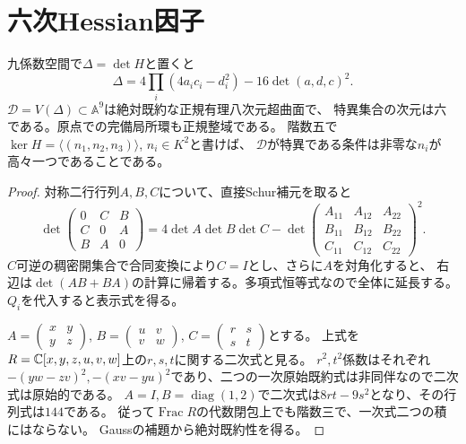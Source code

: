\section{六次Hessian因子}
\begin{theorem}\label{mh:delta}
九係数空間で$\Delta=\det H$と置くと
\[
 \Delta=4\prod_i(4a_ic_i-d_i^2)-16\det(a,d,c)^2.
\]
$\mathcal D=V(\Delta)\subset\mathbb A^9$は絶対既約な正規有理八次元超曲面で、
特異集合の次元は六である。原点での完備局所環も正規整域である。
階数五で$\ker H=\langle(n_1,n_2,n_3)\rangle$, $n_i\in K^2$と書けば、
$\mathcal D$が特異である条件は非零な$n_i$が高々一つであることである。
\end{theorem}
\begin{proof}
対称二行行列$A,B,C$について、直接Schur補元を取ると
\[
 \det\begin{pmatrix}0&C&B\\C&0&A\\B&A&0\end{pmatrix}
 =4\det A\det B\det C-
 \det\begin{pmatrix}A_{11}&A_{12}&A_{22}\\B_{11}&B_{12}&B_{22}\\C_{11}&C_{12}&C_{22}\end{pmatrix}^{\!2}.
\]
$C$可逆の稠密開集合で合同変換により$C=I$とし、さらに$A$を対角化すると、
右辺は$\det(AB+BA)$の計算に帰着する。多項式恒等式なので全体に延長する。
$Q_i$を代入すると表示式を得る。

$A=\left(\begin{smallmatrix}x&y\\y&z\end{smallmatrix}\right)$,
$B=\left(\begin{smallmatrix}u&v\\v&w\end{smallmatrix}\right)$,
$C=\left(\begin{smallmatrix}r&s\\s&t\end{smallmatrix}\right)$とする。
上式を$R=\mathbb C[x,y,z,u,v,w]$上の$r,s,t$に関する二次式と見る。
$r^2,t^2$係数はそれぞれ$-(yw-zv)^2,-(xv-yu)^2$であり、二つの一次原始既約式は非同伴なので二次式は原始的である。
$A=I,B=\operatorname{diag}(1,2)$で二次式は$8rt-9s^2$となり、その行列式は$144$である。
従って$\operatorname{Frac}R$の代数閉包上でも階数三で、一次式二つの積にはならない。
Gaussの補題から絶対既約性を得る。


\end{proof}
